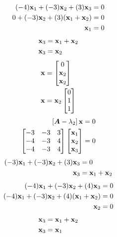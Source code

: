 \documentclass{article}
\begin{document}
\begin{align*}
	(-4)\vect{x}_1 + (-3)\vect{x}_2 + (3)\vect{x}_3 & = 0 \\
	0 + (-3)\vect{x}_2 + (3)(\vect{x}_1 + \vect{x}_2) & = 0 \\
	\vect{x}_1 & = 0
\end{align*}
\begin{align*}
	\vect{x}_3 & = \vect{x}_1 + \vect{x}_2 \\
	\vect{x}_3 & = \vect{x}_2
\end{align*}
\begin{align*}
	\vect{x} & = \begin{bmatrix} 0 \\ \vect{x}_2 \\ \vect{x}_2 \end{bmatrix} \\
	\vect{x} & = \vect{x}_2 \begin{bmatrix} 0 \\ 1 \\ 1 \end{bmatrix}
\end{align*}
\begin{align*}
	\left[ \matr{A} - \lambda_2 \right] \vect{x} & = 0 \\
	\begin{bmatrix}
		-3 & -3 & 3 \\
		-4 & -3 & 4 \\
		-4 & -3 & 4
	\end{bmatrix}
	\begin{bmatrix} \vect{x}_1 \\ \vect{x}_2 \\ \vect{x}_3 \end{bmatrix} & = 0
\end{align*}
\begin{align*}
	(-3)\vect{x}_1 + (-3)\vect{x}_2 + (3)\vect{x}_3 & = 0 \\
	\vect{x}_3 & = \vect{x}_1 + \vect{x}_2
\end{align*}
\begin{align*}
	(-4)\vect{x}_1 + (-3)\vect{x}_2 + (4)\vect{x}_3 & = 0 \\
	(-4)\vect{x}_1 + (-3)\vect{x}_2 + (4)(\vect{x}_1 + \vect{x}_2) & = 0 \\
	\vect{x}_2 & = 0
\end{align*}
\begin{align*}
	\vect{x}_3 & = \vect{x}_1 + \vect{x}_2 \\
	\vect{x}_3 & = \vect{x}_1
\end{align*}
\end{document}
